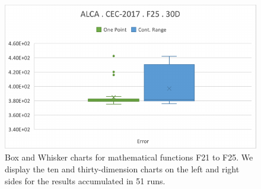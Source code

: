 \documentclass[graybox]{svmult}
\begin{document}
\begin{figure}[!ht]
\begin{minipage}[h]{0.49\linewidth}
        \end{minipage}
        \hfill
        \begin{minipage}[h]{0.49\linewidth}
            \includegraphics[width=1\linewidth]{img/fig_experiment_F25x30D.pdf} 
        \end{minipage}
        
        \caption{Box and Whisker charts for mathematical functions F21 to F25. We display the ten and thirty-dimension charts on the left and right sides for the results accumulated in 51 runs.} \label{fig.experiment_F21-F25}
    \end{figure}

    \FloatBarrier
\end{document}
